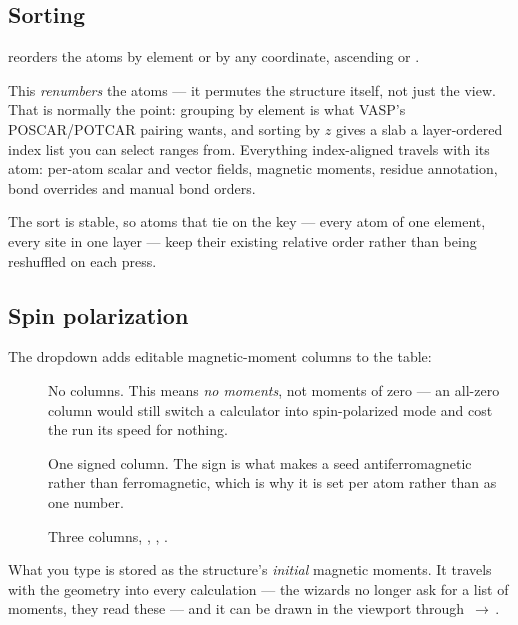 \subsection{Sorting}

 reorders the atoms by element or by any coordinate, ascending or
.

This \emph{renumbers} the atoms --- it permutes the structure itself, not just
the view. That is normally the point: grouping by element is what VASP's
POSCAR/POTCAR pairing wants, and sorting by $z$ gives a slab a layer-ordered
index list you can select ranges from. Everything index-aligned travels with
its atom: per-atom scalar and vector fields, magnetic moments, residue
annotation, bond overrides and manual bond orders.

The sort is stable, so atoms that tie on the key --- every atom of one element,
every site in one layer --- keep their existing relative order rather than being
reshuffled on each press.

\subsection{Spin polarization}

The  dropdown adds editable magnetic-moment columns to
the table:

\begin{description}
  \item[] No columns. This means \emph{no moments}, not
    moments of zero --- an all-zero column would still switch a calculator into
    spin-polarized mode and cost the run its speed for nothing.
  \item[] One signed  column. The
    sign is what makes a seed antiferromagnetic rather than ferromagnetic,
    which is why it is set per atom rather than as one number.
  \item[] Three columns, , , .
\end{description}

What you type is stored as the structure's \emph{initial} magnetic moments. It
travels with the geometry into every calculation --- the wizards no longer ask
for a list of moments, they read these --- and it can be drawn in the viewport
through \menusep{}\menusep{}\,$\rightarrow$\,.

